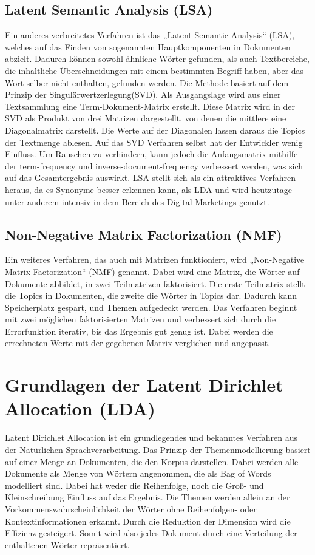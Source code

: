 \documentclass[german,version-2020-11]{uzl-thesis}
\begin{document}
\subsection{Latent Semantic Analysis (LSA)}
Ein anderes verbreitetes Verfahren ist das „Latent Semantic Analysis“ (LSA), welches auf das Finden von sogenannten Hauptkomponenten in Dokumenten abzielt. Dadurch können sowohl ähnliche Wörter gefunden, als auch Textbereiche, die inhaltliche Überschneidungen mit einem bestimmten Begriff haben, aber das Wort selber nicht enthalten, gefunden werden. Die Methode basiert auf dem Prinzip der Singulärwertzerlegung(SVD). Als Ausgangslage wird aus einer Textsammlung eine Term-Dokument-Matrix erstellt. Diese Matrix wird in der SVD als Produkt von drei Matrizen dargestellt, von denen die mittlere eine Diagonalmatrix darstellt. Die Werte auf der Diagonalen lassen daraus die Topics der Textmenge ablesen. Auf das SVD Verfahren selbst hat der Entwickler wenig Einfluss. Um Rauschen zu verhindern, kann jedoch die Anfangsmatrix mithilfe der term-frequency und inverse-document-frequency verbessert werden, was sich auf das Gesamtergebnis auswirkt. LSA stellt sich als ein attraktives Verfahren heraus, da es Synonyme besser erkennen kann, als LDA und wird heutzutage unter anderem intensiv in dem Bereich des Digital Marketings genutzt.

\subsection{Non-Negative Matrix Factorization (NMF)}
Ein weiteres Verfahren, das auch mit Matrizen funktioniert, wird „Non-Negative Matrix Factorization“ (NMF) genannt. Dabei wird eine Matrix, die Wörter auf Dokumente abbildet, in zwei Teilmatrizen faktorisiert. Die erste Teilmatrix stellt die Topics in Dokumenten, die zweite die Wörter in Topics dar. Dadurch kann Speicherplatz gespart, und Themen aufgedeckt werden. Das Verfahren beginnt mit zwei möglichen faktorisierten Matrizen und verbessert sich durch die Errorfunktion iterativ, bis das Ergebnis gut genug ist. Dabei werden die errechneten Werte mit der gegebenen Matrix verglichen und angepasst.


\section{Grundlagen der Latent Dirichlet Allocation (LDA)}
Latent Dirichlet Allocation ist ein grundlegendes und bekanntes Verfahren aus der Natürlichen Sprachverarbeitung. Das Prinzip der Themenmodellierung basiert auf einer Menge an Dokumenten, die den Korpus darstellen. Dabei werden alle Dokumente als Menge von Wörtern angenommen, die als Bag of Words modelliert sind. Dabei hat weder die Reihenfolge, noch die Groß- und Kleinschreibung Einfluss auf das Ergebnis. Die Themen werden  allein an der Vorkommenswahrscheinlichkeit der Wörter ohne Reihenfolgen- oder Kontextinformationen erkannt. Durch die Reduktion der Dimension wird die Effizienz gesteigert. Somit wird also jedes Dokument durch eine Verteilung der enthaltenen Wörter repräsentiert.\\
\end{document}
